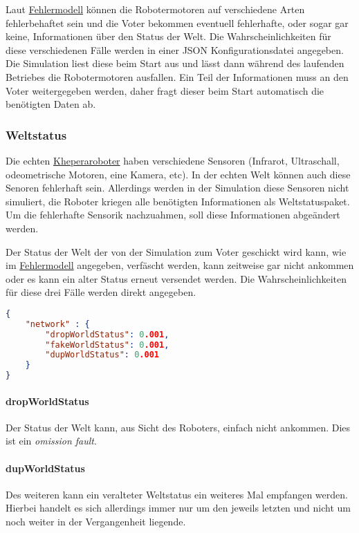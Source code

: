 Laut \hyperref[fm]{Fehlermodell} k{\"{o}}nnen die Robotermotoren auf verschiedene Arten fehlerbehaftet
sein und die Voter bekommen eventuell fehlerhafte, oder sogar gar keine, Informationen {\"{u}}ber
den Status der Welt. Die Wahrscheinlichkeiten f{\"{u}}r diese verschiedenen F{\"{a}}lle
werden in einer JSON Konfigurationsdatei angegeben. Die Simulation liest diese beim Start aus und 
l{\"{a}}sst dann w{\"{a}}hrend des laufenden Betriebes die Robotermotoren ausfallen.
Ein Teil der Informationen muss an den Voter weitergegeben werden, daher fragt dieser beim Start
automatisch die ben{\"{o}}tigten Daten ab.


\subsubsection{Weltstatus}
Die echten \hyperref[khepera]{Kheperaroboter} haben verschiedene Sensoren (Infrarot, Ultraschall,
odeometrische Motoren, eine Kamera, etc). In der echten Welt k{\"{o}}nnen auch diese Senoren fehlerhaft
sein. Allerdings werden in der Simulation diese Sensoren nicht simuliert, die Roboter kriegen alle
ben{\"{o}}tigten Informationen als Weltstatuspaket. Um die fehlerhafte Sensorik nachzuahmen, soll diese
Informationen abge{\"{a}}ndert werden.

Der Status der Welt der von der Simulation zum Voter geschickt wird kann, wie im \hyperref[fm]{Fehlermodell} angegeben, verf{\"{a}}scht werden, kann zeitweise gar
nicht ankommen oder es kann ein alter Status erneut versendet werden. Die Wahrscheinlichkeiten f{\"{u}}r diese drei F{\"{a}}lle werden direkt angegeben.
\begin{lstlisting}[frame=single, language=json] 
{
	"network" : {
		"dropWorldStatus": 0.001,
		"fakeWorldStatus": 0.001,
		"dupWorldStatus": 0.001
	}
}
\end{lstlisting}

\paragraph{dropWorldStatus} Der Status der Welt kann, aus Sicht des Roboters, einfach nicht ankommen. Dies
	ist ein \textit{omission fault}.
\paragraph{dupWorldStatus} Des weiteren kann ein veralteter Weltstatus ein weiteres Mal empfangen werden.
    Hierbei handelt es sich allerdings immer nur um den jeweils letzten und nicht um noch weiter in
	der Vergangenheit liegende.
